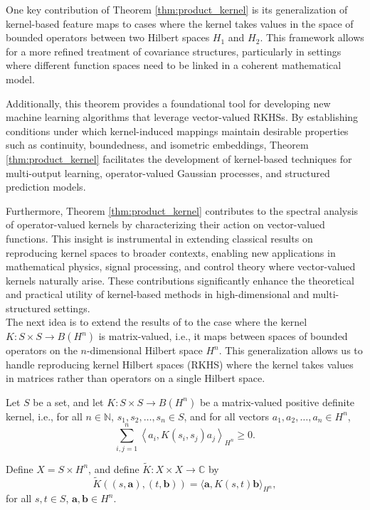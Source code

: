 \documentclass[11pt]{amsart}
\theoremstyle{definition}
\numberwithin{equation}{section}
\begin{document}
One key contribution of Theorem \ref{thm:product_kernel} is its generalization of kernel-based feature maps to cases where the kernel takes values in the space of bounded operators between two Hilbert spaces $H_1$ and $H_2$. This framework allows for a more refined treatment of covariance structures, particularly in settings where different function spaces need to be linked in a coherent mathematical model.

Additionally, this theorem provides a foundational tool for developing new machine learning algorithms that leverage vector-valued RKHSs. By establishing conditions under which kernel-induced mappings maintain desirable properties such as continuity, boundedness, and isometric embeddings, Theorem \ref{thm:product_kernel} facilitates the development of kernel-based techniques for multi-output learning, operator-valued Gaussian processes, and structured prediction models.

Furthermore, Theorem \ref{thm:product_kernel} contributes to the spectral analysis of operator-valued kernels by characterizing their action on vector-valued functions. This insight is instrumental in extending classical results on reproducing kernel spaces to broader contexts, enabling new applications in mathematical physics, signal processing, and control theory where vector-valued kernels naturally arise. These contributions significantly enhance the theoretical and practical utility of kernel-based methods in high-dimensional and multi-structured settings.\\

\noindent
The next idea is to extend the results of \cite[Theorem 2.1]{Jorgensen2024} to the case where the kernel \( K: S \times S \to B(H^n) \) is matrix-valued, i.e., it maps between spaces of bounded operators on the \( n \)-dimensional Hilbert space \( H^n \). This generalization allows us to handle reproducing kernel Hilbert spaces (RKHS) where the kernel takes values in matrices rather than operators on a single Hilbert space.

Let \( S \) be a set, and let \( K: S \times S \to B(H^n) \) be a matrix-valued positive definite kernel, i.e., for all \( n \in \mathbb{N} \), \( s_1, s_2, \dots, s_n \in S \), and for all vectors \( a_1, a_2, \dots, a_n \in H^n \),
\[
\sum_{i,j=1}^{n} \left\langle a_i, K(s_i, s_j) a_j \right\rangle_{H^n} \geq 0.
\]

Define \( X = S \times H^n \), and define \( \tilde{K}: X \times X \to \mathbb{C} \) by
\[
\tilde{K}((s, \mathbf{a}), (t, \mathbf{b})) = \langle \mathbf{a}, K(s, t) \mathbf{b} \rangle_{H^n},
\]
for all \( s, t \in S \), \( \mathbf{a}, \mathbf{b} \in H^n \).
\end{document}
